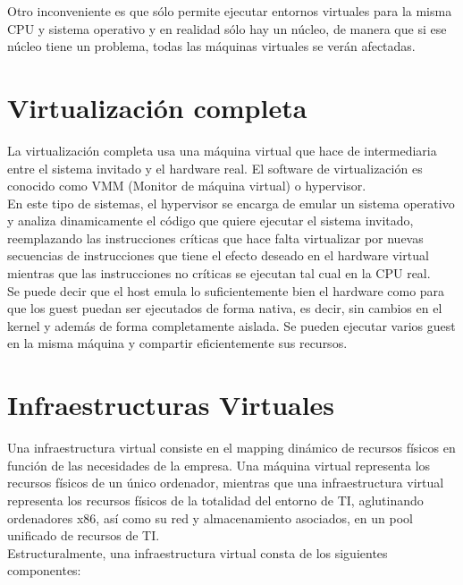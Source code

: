 \documentclass[10pt,a4paper,spanish]{report}
\begin{document}
  \noindent
  Otro inconveniente es que sólo permite ejecutar entornos virtuales para la misma CPU y sistema operativo y en realidad sólo hay un núcleo, de manera que si ese núcleo tiene un problema, todas las máquinas virtuales se verán afectadas.

  \section{Virtualización completa}

  \noindent
  La virtualización completa usa una máquina virtual que hace de intermediaria entre el sistema invitado y el hardware real. El software de virtualización es conocido como VMM (Monitor de máquina virtual) o hypervisor.\\

  \noindent
  En este tipo de sistemas, el hypervisor se encarga de emular un sistema operativo y analiza dinamicamente el código que quiere ejecutar el sistema invitado, reemplazando las instrucciones críticas que hace falta virtualizar por nuevas secuencias de instrucciones que tiene el efecto deseado en el hardware virtual mientras que las instrucciones no críticas se ejecutan tal cual en la CPU real. \\

  \noindent
  Se puede decir que el host emula lo suficientemente bien el hardware como para que los guest puedan ser ejecutados de forma nativa, es decir, sin cambios en el kernel y además de forma completamente aislada. Se pueden ejecutar varios guest en la misma máquina y compartir eficientemente sus recursos.

  \section{Infraestructuras Virtuales}

  \noindent
  Una infraestructura virtual consiste en el mapping dinámico de recursos físicos en función de las necesidades de la empresa. Una máquina virtual representa los recursos físicos de un único ordenador, mientras que una infraestructura virtual representa los recursos físicos de la totalidad del entorno de TI, aglutinando ordenadores x86, así como su red y almacenamiento asociados, en un pool unificado de recursos de TI. \\

  \noindent
  Estructuralmente, una infraestructura virtual consta de los siguientes componentes:
\end{document}

